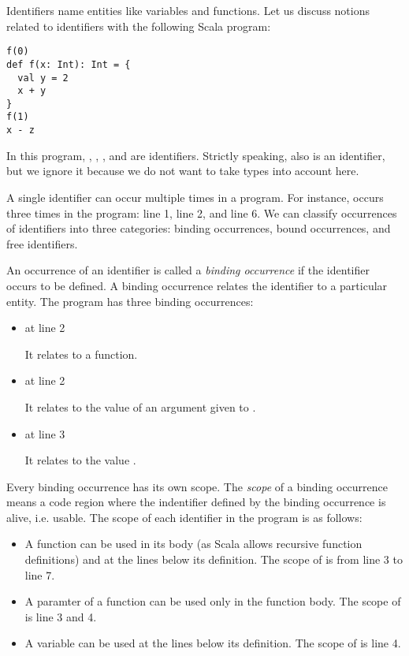 Identifiers name entities like variables and functions.
Let us discuss notions related to identifiers with the following Scala program:

\begin{verbatim}
f(0)
def f(x: Int): Int = {
  val y = 2
  x + y
}
f(1)
x - z
\end{verbatim}

In this program, , , , and  are identifiers. Strictly speaking,
 also is an identifier, but we ignore it because we do not want to take
types into account here.

A single identifier can occur multiple times in a program. For instance,
 occurs three times in the program: line 1, line 2, and line 6.
We can classify occurrences of identifiers into three categories:
binding occurrences, bound occurrences, and free identifiers.

An occurrence of an identifier is called a \textit{binding occurrence}
if the identifier occurs to be defined. A binding occurrence relates the
identifier to a particular entity. The program has three binding occurrences:

\begin{itemize}
  \item {} at line 2

    It relates  to a function.

  \item {} at line 2

    It relates  to the value of an argument given to .

  \item {} at line 3

    It relates  to the value .
\end{itemize}

Every binding occurrence has its own scope. The \textit{scope} of a binding
occurrence means a code region where the indentifier defined by the binding
occurrence is alive, i.e. usable. The scope of each identifier in the program is as follows:

\begin{itemize}
  \item {}

    A function can be used in its body (as Scala allows recursive function
    definitions) and at the lines below its definition. The scope of
     is from line 3 to line 7.

  \item {}

    A paramter of a function can be used only in the function body. The scope of
     is line 3 and 4.

  \item {}

    A variable can be used at the lines below its definition. The scope of
     is line 4.
\end{itemize}


